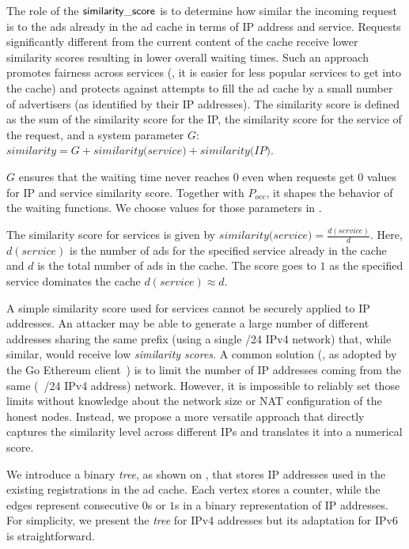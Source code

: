 The role of the $\mathsf{similarity\_score}$ is to determine how similar the incoming request is to the ads already in the ad cache in terms of IP address and service. 
Requests significantly different from the current content of the cache receive lower similarity scores resulting in lower overall waiting times. 
Such an approach promotes fairness across services (\ie, it is easier for less popular services to get into the cache) and protects against attempts to fill the ad cache by a small number of advertisers (as identified by their IP addresses). The similarity score is defined as the sum of the similarity score for the IP, the similarity score for the service of the request, and a system parameter $G$: $\textit{similarity} = G + \textit{similarity(service)} + \textit{similarity(IP)}$. 

$G$ ensures that the waiting time never reaches $0$ even when requests get $0$ values for IP and service similarity score. Together with $P_\textit{occ}$, it shapes the behavior of the waiting functions. We choose values for those parameters in .

The similarity score for services is given by $\textit{similarity(service)}= \frac{d(\textit{service})}{d}$.
Here, $d(\textit{service})$ is the number of ads for the specified service already in the cache and $d$ is the total number of ads in the cache. 
The score goes to $1$ as the specified service dominates the cache $d(\textit{service}) \approx d$. 

A simple similarity score used for services cannot be securely applied to IP addresses. 
An attacker may be able to generate a large number of different addresses sharing the same prefix (\eg using a single /24 IPv4 network) that, while similar, would receive low \emph{similarity scores}.
A common solution (\eg, as adopted by the Go Ethereum client~\cite{geth,marcus2018low}) is to limit the number of IP addresses coming from the same (\eg \ /24 IPv4 address) network.
However, it is impossible to reliably set those limits without knowledge about the network size or NAT configuration of the honest nodes. 
Instead, we propose a more versatile approach that directly captures the similarity level across different IPs and translates it into a numerical score. 

We introduce a binary \emph{tree}, as shown on , that stores IP addresses used in the existing registrations in the ad cache.
Each vertex stores a counter, while the edges represent consecutive $0$s or $1$s in a binary representation of IP addresses.
For simplicity, we present the \emph{tree} for IPv4 addresses but its adaptation for IPv6 is straightforward.

